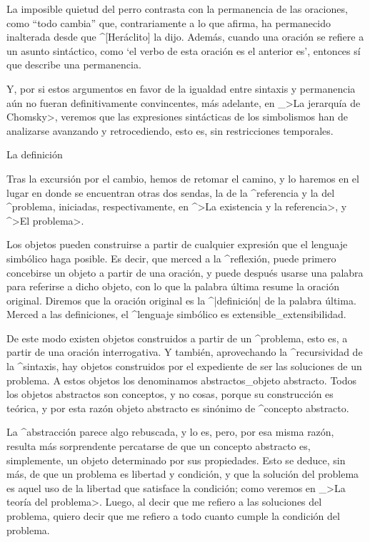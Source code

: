 La imposible quietud del perro contrasta con la permanencia de las
oraciones, como ``todo cambia'' que, contrariamente a lo que afirma, ha
permanecido inalterada desde que ^[Heráclito] la dijo. Además, cuando
una oración se refiere a un asunto sintáctico, como `el verbo de esta
oración es el anterior es', entonces sí que describe una permanencia.

Y, por si estos argumentos en favor de la igualdad entre sintaxis y
permanencia aún no fueran definitivamente convincentes, más adelante, en
_>La jerarquía de Chomsky>, veremos que las expresiones sintácticas de
los simbolismos han de analizarse avanzando y retrocediendo, esto es,
sin restricciones temporales.


\Section La definición

Tras la excursión por el cambio, hemos de retomar el camino, y lo
haremos en el lugar en donde se encuentran otras dos sendas, la de la
^{referencia} y la del ^{problema}, iniciadas, respectivamente, en ^>La
existencia y la referencia>, y ^>El problema>.

Los objetos pueden construirse a partir de cualquier expresión que el
lenguaje simbólico haga posible. Es decir, que merced a la ^{reflexión},
puede primero concebirse un objeto a partir de una oración, y puede
después usarse una palabra para referirse a dicho objeto, con lo que la
palabra última resume la oración original. Diremos que la oración
original es la ^|definición| de la palabra última. Merced a las
definiciones, el ^{lenguaje simbólico} es extensible_{extensibilidad}.

De este modo existen objetos construidos a partir de un ^{problema},
esto es, a partir de una oración interrogativa. Y también, aprovechando
la ^{recursividad} de la ^{sintaxis}, hay objetos construidos por el
expediente de ser las soluciones de un problema. A estos objetos los
denominamos abstractos_{objeto abstracto}. Todos los objetos abstractos
son conceptos, y no cosas, porque su construcción es teórica, y por esta
razón objeto abstracto es sinónimo de ^{concepto abstracto}.

La ^{abstracción} parece algo rebuscada, y lo es, pero, por esa misma
razón, resulta más sorprendente percatarse de que un concepto abstracto
es, simplemente, un objeto determinado por sus propiedades. Esto se
deduce, sin más, de que un problema es libertad y condición, y que la
solución del problema es aquel uso de la libertad que satisface la
condición; como veremos en _>La teoría del problema>. Luego, al decir
que me refiero a las soluciones del problema, quiero decir que me
refiero a todo cuanto cumple la condición del problema.

